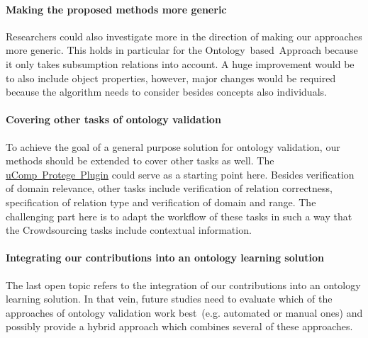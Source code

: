 \paragraph{Making the proposed methods more generic}
Researchers could also investigate more in the direction of making our approaches more generic. This holds in particular for the Ontology~based~Approach because it only takes subsumption relations into account. A huge improvement would be to also include object properties, however, major changes would be required because the algorithm needs to consider besides concepts also individuals. 

\paragraph{Covering other tasks of ontology validation}
To achieve the goal of a general purpose solution for ontology validation, our methods should be extended to cover other tasks as well.
The \hyperref[sec:ucomp_protege_plugin]{uComp~Protege~Plugin} could serve as a starting point here. Besides verification of domain relevance, other tasks include verification of relation correctness, specification of relation type and verification of domain and range. The challenging part here is to adapt the workflow of these tasks in such a way that the Crowdsourcing tasks include contextual information. 

\paragraph{Integrating our contributions into an ontology learning solution}
The last open topic refers to the integration of our contributions into an ontology learning solution. In that vein, future studies need to evaluate which of the approaches of ontology validation work best~(e.g. automated or manual ones) and possibly provide a hybrid approach which combines several of these approaches.

